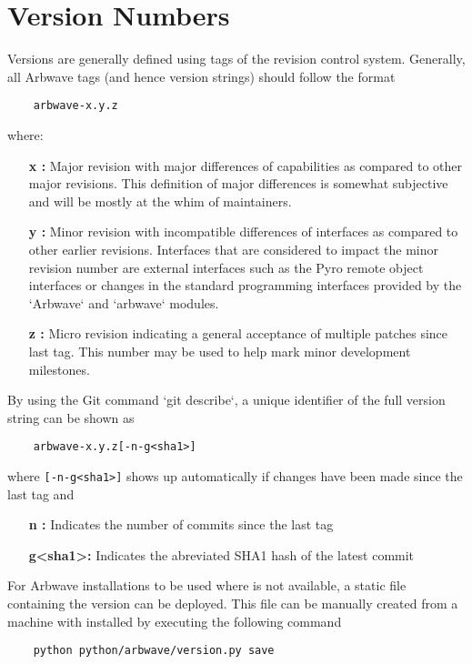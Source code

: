 \thispagestyle{fancy}
\pagestyle{fancy}

\section{Version Numbers}
Versions are generally defined using tags of the  revision control
system.  Generally, all Arbwave tags (and hence version strings) should follow
the format
\begin{verbatim}
    arbwave-x.y.z
\end{verbatim}
  where:
\begin{itemize}[leftmargin=2cm]
  \item[\textbf{x :}] Major revision with major differences of capabilities as compared to
      other major revisions.  This definition of major differences is somewhat
      subjective and will be mostly at the whim of maintainers.
  \item[\textbf{y :}] Minor revision with incompatible differences of interfaces as compared
      to other earlier revisions.  Interfaces that are considered to impact the
      minor revision number are external interfaces such as the Pyro remote
      object interfaces or changes in the standard programming interfaces
      provided by the `Arbwave` and `arbwave` modules.
  \item[\textbf{z :}] Micro revision indicating a general acceptance of multiple patches since
      last tag.  This number may be used to help mark minor development
      milestones.
\end{itemize}
%
By using the Git command `git describe`, a unique identifier of the full
version string can be shown as
\begin{verbatim}
    arbwave-x.y.z[-n-g<sha1>]
\end{verbatim}
  where \verb|[-n-g<sha1>]| shows up automatically if changes have been made
  since the last tag and
\begin{itemize}[leftmargin=2cm]
  \item[\textbf{n :}] Indicates the number of commits since the last tag
  \item[\textbf{g\textless sha1\textgreater :}] Indicates the abreviated SHA1
    hash of the latest commit
\end{itemize}

\vspace{1em}
For Arbwave installations to be used where  is not available, a static
file containing the version can be deployed.  This file can be manually created
from a machine with  installed by executing the following command
\begin{verbatim}
    python python/arbwave/version.py save
\end{verbatim}


